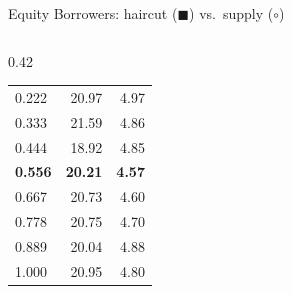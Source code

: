 \documentclass[aspectratio=169,10pt]{beamer}
\begin{document}
\begin{frame}{Equity Borrowers: haircut ($\blacksquare$) vs.\ supply ($\circ$)}
\begin{columns}[T]
\begin{column}{0.42\textwidth}
\begin{tabular}{lrr}
        0.222 & 20.97 & 4.97 \\
        0.333 & 21.59 & 4.86 \\
        0.444 & 18.92 & 4.85 \\
        \textbf{0.556} & \textbf{20.21} & \textbf{4.57} \\
        0.667 & 20.73 & 4.60 \\
        0.778 & 20.75 & 4.70 \\
        0.889 & 20.04 & 4.88 \\
        1.000 & 20.95 & 4.80 \\
        \bottomrule
      \end{tabular}
    \end{column}
  \end{columns}
\end{frame}
\end{document}
